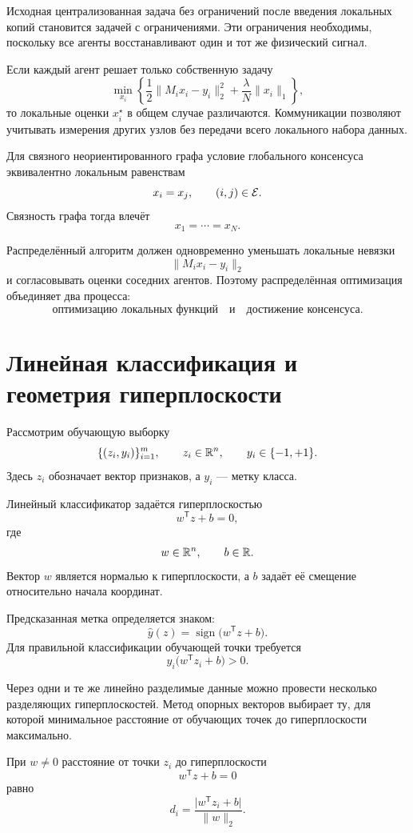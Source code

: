 Исходная централизованная задача без ограничений после введения
локальных копий становится задачей с ограничениями. Эти ограничения
необходимы, поскольку все агенты восстанавливают один и тот же
физический сигнал.

Если каждый агент решает только собственную задачу
\[
    \min_{x_i}
    \left\{
        \frac12\lVert M_ix_i-y_i\rVert_2^2
        +
        \frac{\lambda}{N}\lVert x_i\rVert_1
    \right\},
\]
то локальные оценки \(x_i^\star\) в общем случае различаются.
Коммуникации позволяют учитывать измерения других узлов без передачи
всего локального набора данных.

Для связного неориентированного графа условие глобального консенсуса
эквивалентно локальным равенствам
\[
    x_i=x_j,
    \qquad
    (i,j)\in\mathcal{E}.
\]
Связность графа тогда влечёт
\[
    x_1=\cdots=x_N.
\]

Распределённый алгоритм должен одновременно уменьшать локальные
невязки
\[
    \lVert M_ix_i-y_i\rVert_2
\]
и согласовывать оценки соседних агентов. Поэтому распределённая
оптимизация объединяет два процесса:
\[
    \text{оптимизацию локальных функций}
    \quad\text{и}\quad
    \text{достижение консенсуса}.
\]

\section{Линейная классификация и геометрия гиперплоскости}

Рассмотрим обучающую выборку
\[
    \{(z_i,y_i)\}_{i=1}^{m},
    \qquad
    z_i\in\mathbb{R}^n,
    \qquad
    y_i\in\{-1,+1\}.
\]
Здесь \(z_i\) обозначает вектор признаков, а \(y_i\) --- метку класса.

Линейный классификатор задаётся гиперплоскостью
\[
    w^{\mathsf T}z+b=0,
\]
где
\[
    w\in\mathbb{R}^n,\qquad b\in\mathbb{R}.
\]
Вектор \(w\) является нормалью к гиперплоскости, а \(b\) задаёт её
смещение относительно начала координат.

Предсказанная метка определяется знаком:
\[
    \widehat y(z)
    =
    \operatorname{sign}\bigl(w^{\mathsf T}z+b\bigr).
\]
Для правильной классификации обучающей точки требуется
\[
    y_i\bigl(w^{\mathsf T}z_i+b\bigr)>0.
\]

Через одни и те же линейно разделимые данные можно провести несколько
разделяющих гиперплоскостей. Метод опорных векторов выбирает ту, для
которой минимальное расстояние от обучающих точек до гиперплоскости
максимально.



При \(w\ne0\) расстояние от точки \(z_i\) до гиперплоскости
\[
    w^{\mathsf T}z+b=0
\]
равно
\[
    d_i
    =
    \frac{
        \lvert w^{\mathsf T}z_i+b\rvert
    }{
        \lVert w\rVert_2
    }.
\]

